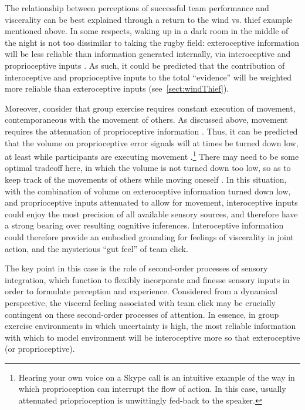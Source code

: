 \begin{CJK}{UTF8}{gbsn}

The relationship between perceptions of successful team performance and viscerality can be best explained through a return to the wind vs. thief example mentioned above.  In some respects, waking up in a dark room in the middle of the night is not too dissimilar to taking the rugby field: exteroceptive information will be less reliable than information generated internally, via interoceptive and proprioceptive inputs \citep{Pezzulo2014}. As such, it could be predicted that the contribution of interoceptive and proprioceptive inputs to the total ``evidence'' will be weighted more reliable than exteroceptive inputs (see~\ref{sect:windThief}).

Moreover, consider that group exercise requires constant execution of movement, contemporaneous with the movement of others. As discussed above, movement requires the attenuation of proprioceptive information \citep[so as not to interrupt the flow of movement itself, see][]{Dietrich2004a}.  Thus, it can be predicted that the volume on proprioceptive error signals will at times be turned down low, at least while participants are executing movement \citep{Friston2015}.\footnote{Hearing your own voice on a Skype call is an intuitive example of the way in which proprioception can interrupt the flow of action. In this case, usually attenuated prioprioception is unwittingly fed-back to the speaker.}  There may need to be some optimal tradeoff here, in which the volume is not turned down too low, so as to keep track of the movements of others while moving oneself \citep{Pesquita2017}.  In this situation, with the combination of volume on exteroceptive information turned down low, and proprioceptive inputs attenuated to allow for movement, interoceptive inputs could enjoy the most precision of all available sensory sources, and therefore have a strong bearing over resulting cognitive inferences.  Interoceptive information could therefore provide an embodied grounding for feelings of viscerality in joint action, and the mysterious ``gut feel'' of team click.

The key point in this case is the role of second-order processes of sensory integration, which function to flexibly incorporate and finesse sensory inputs in order to formulate perception and experience.  Considered from a dynamical perspective, the visceral feeling associated with team click may be crucially contingent on these second-order processes of attention.  In essence, in group exercise environments in which uncertainty is high, the most reliable information with which to model environment will be interoceptive more so that exteroceptive (or proprioceptive).


\end{CJK}
